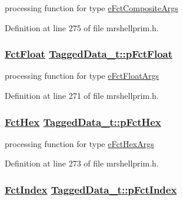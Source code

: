processing function for type \hyperlink{mrshellprim_8h_76a810650461f2062938ee9b82666b3636b7e40fa597a694a95e617ee33e0e6b}{e\-Fct\-Composite\-Args} 



Definition at line 275 of file mrshellprim.h.\hypertarget{structTaggedData__t_ad03fcf6e74b2d534ed2cf5537063d53}{
\subsubsection[pFctFloat]{\setlength{\rightskip}{0pt plus 5cm}\hyperlink{mrshellprim_8h_027c8c25e67dc4b7346ac5713cf673ab}{Fct\-Float} \hyperlink{structTaggedData__t_ad03fcf6e74b2d534ed2cf5537063d53}{Tagged\-Data\_\-t::p\-Fct\-Float}}}
\label{structTaggedData__t_ad03fcf6e74b2d534ed2cf5537063d53}


processing function for type \hyperlink{mrshellprim_8h_76a810650461f2062938ee9b82666b363cf1e6253af3a5870b9c8cc15ce25900}{e\-Fct\-Float\-Args} 



Definition at line 271 of file mrshellprim.h.\hypertarget{structTaggedData__t_2dd447060885b411cbf8a64170057b55}{
\subsubsection[pFctHex]{\setlength{\rightskip}{0pt plus 5cm}\hyperlink{mrshellprim_8h_7e40ba8c9e984665cfe0dbd2b4fa888a}{Fct\-Hex} \hyperlink{structTaggedData__t_2dd447060885b411cbf8a64170057b55}{Tagged\-Data\_\-t::p\-Fct\-Hex}}}
\label{structTaggedData__t_2dd447060885b411cbf8a64170057b55}


processing function for type \hyperlink{mrshellprim_8h_76a810650461f2062938ee9b82666b3654420a8008623d27ad4e6cf8ba76f7b8}{e\-Fct\-Hex\-Args} 



Definition at line 273 of file mrshellprim.h.\hypertarget{structTaggedData__t_41090a9e6e4595a3b989893310a841dc}{
\subsubsection[pFctIndex]{\setlength{\rightskip}{0pt plus 5cm}\hyperlink{mrshellprim_8h_13b0972f6d0c45d484e999ced9aa622c}{Fct\-Index} \hyperlink{structTaggedData__t_41090a9e6e4595a3b989893310a841dc}{Tagged\-Data\_\-t::p\-Fct\-Index}}}
\label{structTaggedData__t_41090a9e6e4595a3b989893310a841dc}


